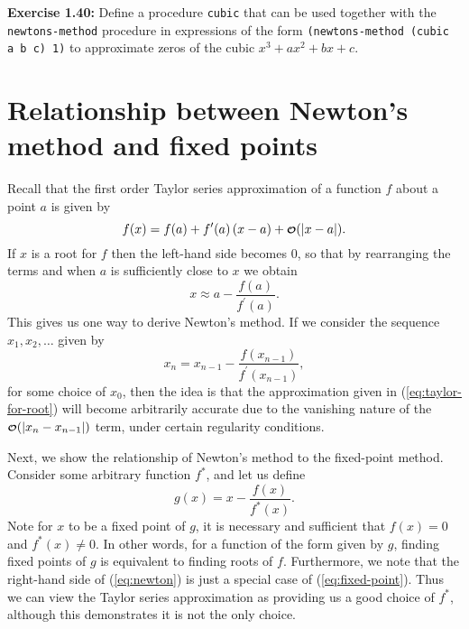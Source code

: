 \documentclass{article}
\newcommand{\littleO}{\bgroup \scriptstyle \boldsymbol{\mathcal{O}} \egroup}
\begin{document}

\noindent \textbf{Exercise 1.40:} Define a procedure \lstinline{cubic} that can
be used together with the \lstinline{newtons-method} procedure in expressions of
the form \lstinline{(newtons-method (cubic a b c) 1)} to approximate zeros of
the cubic $x^3 + ax^2 + bx + c$.

\noindent \hrulefill




\section{Relationship between Newton's method and fixed points}

Recall that the first order Taylor series approximation of a function $f$ about
a point $a$ is given by
\begin{equation}
  f(x) = f(a) + f^{\prime}(a)\, (x -a) + \littleO( |x - a| ).
\end{equation}
If $x$ is a root for $f$ then the left-hand side becomes 0, so that by
rearranging the terms and when $a$ is sufficiently close to $x$ we obtain
\begin{equation}
  \label{eq:taylor-for-root}
  x \approx a - \frac{f(a)}{f^{\prime}(a)}.
\end{equation}
This gives us one way to derive Newton's method.  If we consider the sequence
$x_1, x_2, \dots$ given by
\begin{equation}
  \label{eq:newton}
  x_n = x_{n - 1} - \frac{f(x_{n - 1})}{f^{\prime}(x_{n - 1})},
\end{equation}
for some choice of $x_0$, then the idea is that the approximation given in
(\ref{eq:taylor-for-root}) will become arbitrarily accurate due to the vanishing
nature of the $\littleO( |x_n - x_{n - 1}| )$ term, under certain regularity
conditions.

Next, we show the relationship of Newton's method to the fixed-point method.
Consider some arbitrary function $f^{*}$, and let us define
\begin{equation}
  \label{eq:fixed-point}
  g(x) = x - \frac{f(x)}{f^{*}(x)}.
\end{equation}
Note for $x$ to be a fixed point of $g$, it is necessary and sufficient that
$f(x) = 0$ and $f^{*}(x) \ne 0$.  In other words, for a function of the form
given by $g$, finding fixed points of $g$ is equivalent to finding roots of $f$.
Furthermore, we note that the right-hand side of (\ref{eq:newton}) is just a
special case of (\ref{eq:fixed-point}).  Thus we can view the Taylor series
approximation as providing us a good choice of $f^{*}$, although this
demonstrates it is not the only choice.
\end{document}
